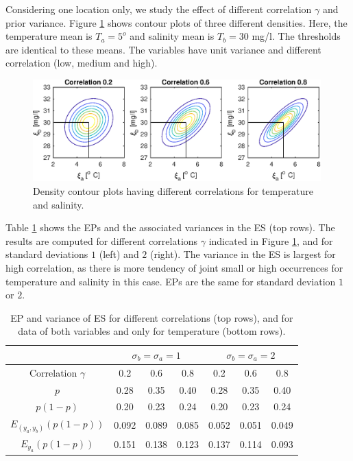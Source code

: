 \documentclass[aoas]{imsart}
\begin{document}
Considering one location only, we study the effect of different correlation $\gamma$ and prior variance. 
Figure \ref{illus_bivarDens} shows contour plots of three different densities. Here, the temperature mean is $T_a=5^o$ and salinity mean is $T_b=30$ mg/l. The thresholds are identical to these means. The variables have unit variance and different correlation (low, medium and high).
\begin{figure}[h!]
\centering
\includegraphics[width=0.99\textwidth]{Figures/illus_bivar.eps}
\caption{Density contour plots having different correlations for temperature and salinity.}\label{illus_bivarDens}
\end{figure}
Table \ref{tab:sim_rhoab} shows the EPs and the associated variances in the ES (top rows). The results are computed for different correlations $\gamma$ indicated in Figure \ref{illus_bivarDens}, and for standard deviations $1$ (left) and $2$ (right). The variance in the ES is largest for high correlation, as there is more tendency of joint small or high occurrences for temperature and salinity in this case. EPs are the same for standard deviation $1$ or $2$. 
\begin{table}[!h]
\centering
\caption{EP and variance of ES for different correlations (top rows), and for data of both variables and only for temperature (bottom rows).}
\begin{tabular}{c|ccc|ccc}
 &\multicolumn{3}{c}{$\sigma_b=\sigma_a=1$} & \multicolumn{3}{c}{$\sigma_b=\sigma_a=2$} \\
\hline
Correlation $\gamma$ & 0.2 & 0.6 & 0.8 & 0.2 & 0.6 & 0.8 \\
\hline
$p$ & 0.28 & 0.35 & 0.40 & 0.28 & 0.35 & 0.40 \\ 
$p(1-p)$ & 0.20 & 0.23 & 0.24 & 0.20 & 0.23 & 0.24 \\ 
$E_{(y_a,y_b)}(p (1-p))$ & 0.092 & 0.089 & 0.085 & 0.052 & 0.051 & 0.049 \\ 
$E_{y_a}(p (1-p))$ & 0.151 & 0.138 & 0.123 & 0.137 & 0.114 & 0.093 \\ 
\hline
\end{tabular}
\label{tab:sim_rhoab}
\end{table}
\end{document}
